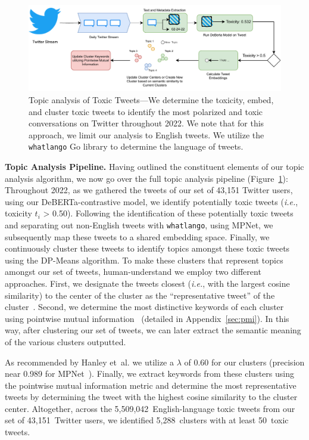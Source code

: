 \begin{figure}

\includegraphics[width=0.9\columnwidth]{figures/Toxic-clustering_documents.drawio.pdf} 
 \caption{Topic analysis of Toxic Tweets---We determine the toxicity, embed, and cluster toxic tweets to identify the most polarized and toxic conversations on Twitter throughout 2022. We note that for this approach, we limit our analysis to English tweets. We utilize the \texttt{whatlango} Go library to determine the language of tweets. \label{fig:toxic-cluster}}
\end{figure}


\vspace{2pt}\noindent
\noindent
\textbf{Topic Analysis Pipeline.}
Having outlined the constituent elements of our topic analysis algorithm, we now go over the full topic analysis pipeline (Figure~\ref{fig:toxic-cluster}): Throughout 2022, as we gathered the tweets of our set of 43,151 Twitter users, using our DeBERTa-contrastive model, we identify potentially toxic tweets (\textit{i.e.}, toxicity $t_i$ > 0.50). Following the identification of these potentially toxic tweets and separating out non-English tweets with \texttt{whatlango}, using MPNet, we subsequently map these tweets to a shared embedding space. Finally, we continuously cluster these tweets to identify topics amongst these toxic tweets using the DP-Means algorithm. To make these clusters that represent topics amongst our set of tweets, human-understand we employ two different approaches. First, we designate the tweets closest (\textit{i.e.}, with the largest cosine similarity) to the center of the cluster as the ``representative tweet'' of the cluster~\cite{grootendorst2020bertopic}. Second, we determine the most distinctive keywords of each cluster using pointwise mutual information~\cite{bouma2009normalized} (detailed in Appendix~\ref{sec:pmi}). In this way, after clustering our set of tweets, we can later extract the semantic meaning of the various clusters outputted. 

As recommended by Hanley {et~al.} we utilize a $\lambda$ of 0.60 for our clusters (precision near 0.989 for MPNet~\cite{hanley2022happenstance,grootendorst2020bertopic}). Finally, we extract keywords from these clusters using the pointwise mutual information metric and determine the most representative tweets by determining the tweet with the highest cosine similarity to the cluster center. Altogether, across the 5,509,042~English-language toxic tweets from our set of 43,151~Twitter users, we identified 5,288~clusters with at least 50~toxic tweets. 

